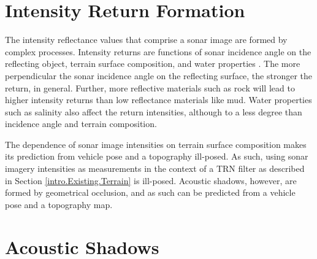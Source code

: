 \section{Intensity Return Formation}
\label{sonar.Intensity}

The intensity reflectance values that comprise a sonar image are formed by complex processes.
Intensity returns are functions of sonar incidence angle on the reflecting object, terrain surface composition, and water properties \cite{Bell1995}. 
The more perpendicular the sonar incidence angle on the reflecting surface, the stronger the return, in general.
Further, more reflective materials such as rock will lead to higher intensity returns than low reflectance materials like mud.
Water properties such as salinity also affect the return intensities, although to a less degree than incidence angle and terrain composition. 

The dependence of sonar image intensities on terrain surface composition makes its prediction from vehicle pose and a topography ill-posed.
As such, using sonar imagery intensities as measurements in the context of a TRN filter as described in Section \ref{intro.Existing.Terrain} is ill-posed.
Acoustic shadows, however, are formed by geometrical occlusion, and as such can be predicted from a vehicle pose and a topography map.

%

\section{Acoustic Shadows}
\label{sonar.Shadows}

